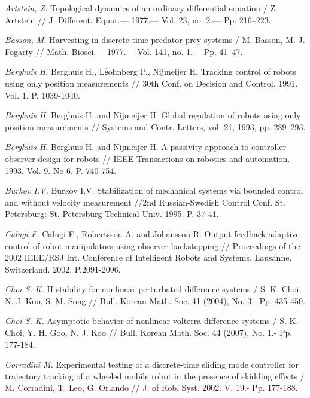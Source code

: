 \begin{thebibliography}{10}
	{\it Artstein, Z.} Topological dynamics of an ordinary differential equation / Z. Artstein // J.
	Different. Equat.— 1977.— Vol. 23, no. 2.— Pp. 216–223.
	
	{\it Basson, M.} Harvesting in discrete-time predator-prey systems / M. Basson, M. J. Fogarty // Math. Biosci.— 1977.— Vol. 141, no. 1.— Pp. 41–47.
	
	{\it Berghuis H.} Berghuis H., Lѐohnberg P., Nijmeijer H. Tracking control of robots using only position measurements // 30th Conf. on Decision and Control. 1991. Vol. 1. P. 1039-1040.
	
	{\it Berghuis H.} Berghuis H. and Nijmeijer H. Global regulation of robots using only position measurements // Systems and Contr. Letters, vol. 21, 1993, pp. 289–293. 
	
	{\it Berghuis H.} Berghuis H. and Nijmeijer H. A passivity approach to controller-observer design for robots // IEEE Transactions on robotics and automation. 1993. Vol. 9. No 6. P. 740-754.
	
	{\it Burkov I.V.} Burkov I.V. Stabilization of mechanical systems via bounded control and without velocity measurement //2nd Russian-Swedish Control Conf. St. Petersburg: St. Petersburg Technical Univ. 1995. P. 37-41.
	
	{\it Calugi F.} Calugi F., Robertsson A. and Johansson R. Output feedback adaptive control of robot manipulators using observer backstepping // Proceedings of the 2002 IEEE/RSJ Int. Conference of Intelligent Robots and Systems. Lausanne, Switzerland. 2002. P.2091-2096.
	
	{\it Choi S. K.} H-stability for nonlinear perturbated difference systems / S. K. Choi, N. J. Koo, S. M. Song // Bull. Korean Math. Soc. 41 (2004), No. 3.- Pp. 435-450.
	
	{\it Choi S. K.} Asymptotic behavior of nonlinear volterra difference systems / S. K. Choi, Y. H. Goo, N. J. Koo // Bull. Korean Math. Soc. 44 (2007), No. 1.- Pp. 177-184.
	
	
	{\it Corradini M.} Experimental testing of a discrete-time sliding mode controller for trajectory tracking of a wheeled mobile robot in the presence of skidding effects / M. Corradini, T. Leo, G. Orlando // J. of Rob. Syst. 2002. V. 19.- Pp. 177-188.
	

\end{thebibliography}
